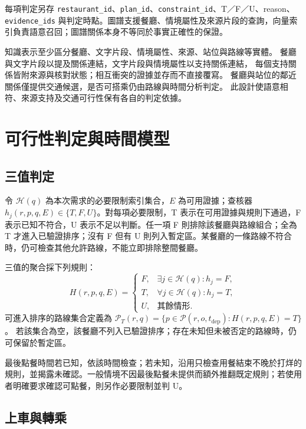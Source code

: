 每項判定另存 \texttt{restaurant\_id}、\texttt{plan\_id}、\texttt{constraint\_id}、T／F／U、reason、\texttt{evidence\_ids} 與判定時點。圖譜支援餐廳、情境屬性及來源片段的查詢，向量索引負責語意召回；圖譜關係本身不等同於事實正確性的保證。


知識表示至少區分餐廳、文字片段、情境屬性、來源、站位與路線等實體。
餐廳與文字片段以提及關係連結，文字片段與情境屬性以支持關係連結，
每個支持關係皆附來源與核對狀態；相互衝突的證據並存而不直接覆寫。
餐廳與站位的鄰近關係僅提供交通候選，是否可搭乘仍由路線與時間分析判定。
此設計使語意相符、來源支持及交通可行性保有各自的判定依據。

\section{可行性判定與時間模型}
\label{sec:feasibility}

\subsection{三值判定}

令 \(\mathcal{H}(q)\) 為本次需求的必要限制索引集合，\(E\) 為可用證據；查核器 \(h_j(r,p,q,E)\in\{T,F,U\}\)。對每項必要限制，T 表示在可用證據與規則下通過，F 表示已知不符合，U 表示不足以判斷。任一項 F 則排除該餐廳與路線組合；全為 T 才進入已驗證排序；沒有 F 但有 U 則列入暫定區。某餐廳的一條路線不符合時，仍可檢查其他允許路線，不能立即排除整間餐廳。



三值的聚合採下列規則：
\[
H(r,p,q,E)=
\begin{cases}
F, & \exists j\in\mathcal{H}(q):h_j=F,\\
T, & \forall j\in\mathcal{H}(q):h_j=T,\\
U, & \text{其餘情形}.
\end{cases}
\]
可進入排序的路線集合定義為
\(\mathcal{P}_{T}(r,q)=\{p\in\mathcal{P}(r,o,t_{\mathrm{dep}}):H(r,p,q,E)=T\}\)。
若該集合為空，該餐廳不列入已驗證排序；存在未知但未被否定的路線時，仍可保留於暫定區。


最後點餐時間若已知，依該時間檢查；若未知，沿用只檢查用餐結束不晚於打烊的規則，並揭露未確認。一般情境不因最後點餐未提供而額外推翻既定規則；若使用者明確要求確認可點餐，則另作必要限制並判 U。

\subsection{上車與轉乘}

